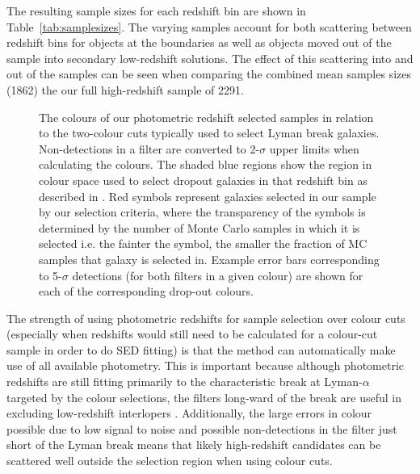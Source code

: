 The resulting sample sizes for each redshift bin are shown in Table~\ref{tab:samplesizes}. The varying samples account for both scattering between redshift bins for objects at the boundaries as well as objects moved out of the sample into secondary low-redshift solutions. The effect of this scattering into and out of the samples can be seen when comparing the combined mean samples sizes (1862) the our full high-redshift sample of 2291.

\begin{figure*}
\caption{The colours of our photometric redshift selected samples in relation to the two-colour cuts typically used to select Lyman break galaxies. Non-detections in a filter are converted to 2-$\sigma$ upper limits when calculating the colours. The shaded blue regions show the region in colour space used to select dropout galaxies in that redshift bin as described in  \citet{2007ApJ...670..928B}. Red symbols represent galaxies selected in our sample by our selection criteria, where the transparency of the symbols is determined by the number of Monte Carlo samples in which it is selected i.e. the fainter the symbol, the smaller the fraction of MC samples that galaxy is selected in. Example error bars corresponding to 5-$\sigma$ detections (for both filters in a given colour) are shown for each of the corresponding drop-out colours.}
\label{fig:colours}
\end{figure*}

The strength of using photometric redshifts for sample selection over colour cuts (especially when redshifts would still need to be calculated for a colour-cut sample in order to do SED fitting) is that the method can automatically make use of all available photometry. This is important because although photometric redshifts are still fitting primarily to the characteristic break at Lyman-$\alpha$ targeted by the colour selections, the filters long-ward of the break are useful in excluding low-redshift interlopers \citep{2011MNRAS.418.2074M}. Additionally, the large errors in colour possible due to low signal to noise and possible non-detections in the filter just short of the Lyman break means that likely high-redshift candidates can be scattered well outside the selection region when using colour cuts. 

